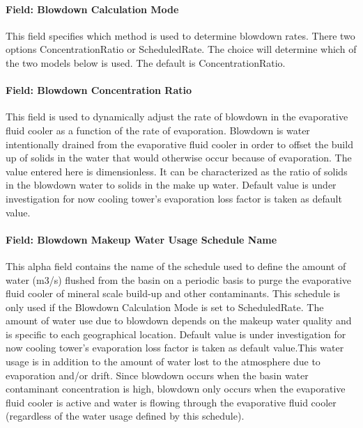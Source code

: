 \paragraph{Field: Blowdown Calculation Mode}\label{field-blowdown-calculation-mode-4}

This field specifies which method is used to determine blowdown rates. There two options ConcentrationRatio or ScheduledRate. The choice will determine which of the two models below is used. The default is ConcentrationRatio.

\paragraph{Field: Blowdown Concentration Ratio}\label{field-blowdown-concentration-ratio-4}

This field is used to dynamically adjust the rate of blowdown in the evaporative fluid cooler as a function of the rate of evaporation. Blowdown is water intentionally drained from the evaporative fluid cooler in order to offset the build up of solids in the water that would otherwise occur because of evaporation. The value entered here is dimensionless. It can be characterized as the ratio of solids in the blowdown water to solids in the make up water. Default value is under investigation for now cooling tower's evaporation loss factor is taken as default value.

\paragraph{Field: Blowdown Makeup Water Usage Schedule Name}\label{field-blowdown-makeup-water-usage-schedule-name-4}

This alpha field contains the name of the schedule used to define the amount of water (m3/s) flushed from the basin on a periodic basis to purge the evaporative fluid cooler of mineral scale build-up and other contaminants. This schedule is only used if the Blowdown Calculation Mode is set to ScheduledRate. The amount of water use due to blowdown depends on the makeup water quality and is specific to each geographical location. Default value is under investigation for now cooling tower's evaporation loss factor is taken as default value.This water usage is in addition to the amount of water lost to the atmosphere due to evaporation and/or drift. Since blowdown occurs when the basin water contaminant concentration is high, blowdown only occurs when the evaporative fluid cooler is active and water is flowing through the evaporative fluid cooler (regardless of the water usage defined by this schedule).

